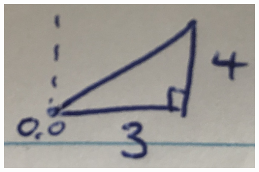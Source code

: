 \documentclass[a4paper, 12pt]{article}
\begin{document}
\begin{center}
\includegraphics[scale=0.05]{triangle}
\end{center}
\end{document}
